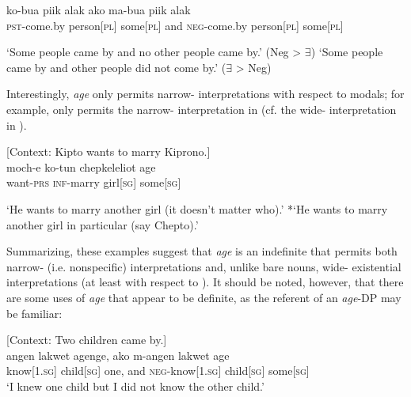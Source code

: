\documentclass[output=paper]{LSP/langsci}
\begin{document}
\begin{exe}
\ex \label{ex:landman:scopepl}
  \gll ko-bua piik alak ako ma-bua piik alak\\	
	   \textsc{pst}-come.by person[\textsc{pl}] some[\textsc{pl}] and \textsc{neg}-come.by person[\textsc{pl}] some[\textsc{pl}]\\
  \begin{xlist}
  \ex \label{ex:landman:narrowpl}‘Some people came by and no other people came by.’ (Neg > $\exists$)
  \ex \label{ex:landman:widepl} ‘Some people came by and other people did not come by.’  ($\exists$  > Neg)  
  \end{xlist}   
\end{exe}

\noindent Interestingly, \textit{age} only permits narrow- interpretations with respect to modals; for example,  only permits the narrow- interpretation in  (cf. the wide- interpretation in ).

\begin{exe}
\ex \label{ex:landman:29} [Context: Kipto wants to marry Kiprono.]\\
 \gll moch-e	ko-tun	chepkeleliot age\\	
want-\textsc{prs} \textsc{inf}-marry girl[\textsc{sg}] some[\textsc{sg}]\\
\begin{xlist}
  \ex \label{ex:landman:30}‘He wants to marry another girl (it doesn't matter who).’
  \ex \label{ex:landman:31} *‘He wants to marry another girl in particular (say Chepto).’ 
  \end{xlist}   
\end{exe}

Summarizing, these examples suggest that \textit{age} is an indefinite that permits both narrow- (i.e. nonspecific) interpretations and, unlike bare nouns, wide- existential interpretations (at least with respect to ). It should be noted, however, that there are some uses of \textit{age} that appear to be definite, as the referent of an \textit{age}-DP may be familiar:

\ea \label{ex:landman:modalage} [Context: Two children came by.]\\
\gll angen lakwet agenge, ako m-angen lakwet age\\
     know[\textsc{1.sg}] child[\textsc{sg}] one, and \textsc{neg}-know[\textsc{1.sg}] child[\textsc{sg}] some[\textsc{sg}]\\
\glt ‘I knew one child but I did not know the other child.’ 
\z
\end{document}
